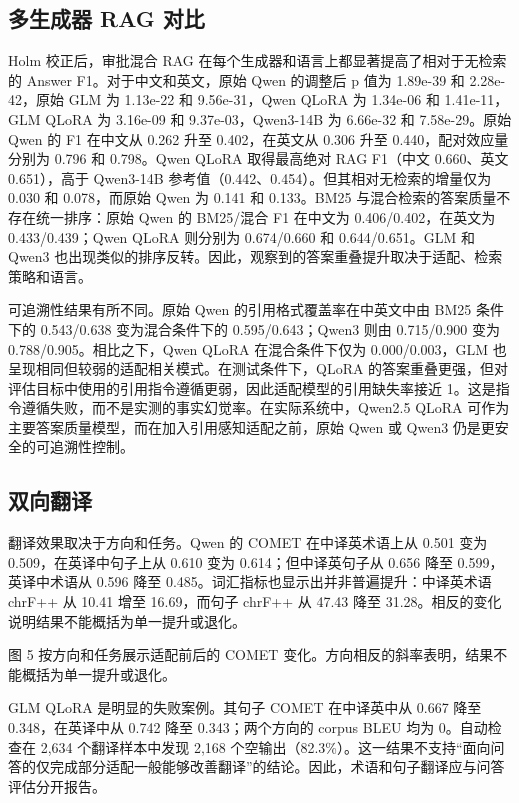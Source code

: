\subsection{多生成器 RAG 对比}

Holm 校正后，审批混合 RAG 在每个生成器和语言上都显著提高了相对于无检索的 Answer F1。对于中文和英文，原始 Qwen 的调整后 p 值为 1.89e-39 和 2.28e-42，原始 GLM 为 1.13e-22 和 9.56e-31，Qwen QLoRA 为 1.34e-06 和 1.41e-11，GLM QLoRA 为 3.16e-09 和 9.37e-03，Qwen3-14B 为 6.66e-32 和 7.58e-29。原始 Qwen 的 F1 在中文从 0.262 升至 0.402，在英文从 0.306 升至 0.440，配对效应量分别为 0.796 和 0.798。Qwen QLoRA 取得最高绝对 RAG F1（中文 0.660、英文 0.651），高于 Qwen3-14B 参考值（0.442、0.454）。但其相对无检索的增量仅为 0.030 和 0.078，而原始 Qwen 为 0.141 和 0.133。BM25 与混合检索的答案质量不存在统一排序：原始 Qwen 的 BM25/混合 F1 在中文为 0.406/0.402，在英文为 0.433/0.439；Qwen QLoRA 则分别为 0.674/0.660 和 0.644/0.651。GLM 和 Qwen3 也出现类似的排序反转。因此，观察到的答案重叠提升取决于适配、检索策略和语言。

可追溯性结果有所不同。原始 Qwen 的引用格式覆盖率在中英文中由 BM25 条件下的 0.543/0.638 变为混合条件下的 0.595/0.643；Qwen3 则由 0.715/0.900 变为 0.788/0.905。相比之下，Qwen QLoRA 在混合条件下仅为 0.000/0.003，GLM 也呈现相同但较弱的适配相关模式。在测试条件下，QLoRA 的答案重叠更强，但对评估目标中使用的引用指令遵循更弱，因此适配模型的引用缺失率接近 1。这是指令遵循失败，而不是实测的事实幻觉率。在实际系统中，Qwen2.5 QLoRA 可作为主要答案质量模型，而在加入引用感知适配之前，原始 Qwen 或 Qwen3 仍是更安全的可追溯性控制。

\subsection{双向翻译}

翻译效果取决于方向和任务。Qwen 的 COMET 在中译英术语上从 0.501 变为 0.509，在英译中句子上从 0.610 变为 0.614；但中译英句子从 0.656 降至 0.599，英译中术语从 0.596 降至 0.485。词汇指标也显示出并非普遍提升：中译英术语 chrF++ 从 10.41 增至 16.69，而句子 chrF++ 从 47.43 降至 31.28。相反的变化说明结果不能概括为单一提升或退化。

图 5 按方向和任务展示适配前后的 COMET 变化。方向相反的斜率表明，结果不能概括为单一提升或退化。

GLM QLoRA 是明显的失败案例。其句子 COMET 在中译英中从 0.667 降至 0.348，在英译中从 0.742 降至 0.343；两个方向的 corpus BLEU 均为 0。自动检查在 2,634 个翻译样本中发现 2,168 个空输出（82.3\%）。这一结果不支持“面向问答的仅完成部分适配一般能够改善翻译”的结论。因此，术语和句子翻译应与问答评估分开报告。

